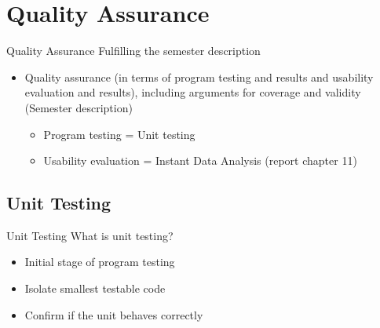 \section{Quality Assurance}

\begin{frame}[fragile] {Quality Assurance} {Fulfilling the semester description}
	\begin{itemize}
		\item Quality assurance (in terms of program testing and results and usability evaluation and results), including arguments for coverage and validity {\footnotesize (Semester description)}
		\begin{itemize}
			\item Program testing = Unit testing
			\item Usability evaluation = Instant Data Analysis (report chapter 11)
		\end{itemize}				
	\end{itemize}

\end{frame}

\subsection{Unit Testing}

\begin{frame}[fragile] {Unit Testing} {What is unit testing?}
	\begin{itemize}
		\item Initial stage of program testing
		\item Isolate smallest testable code
		\item Confirm if the unit behaves correctly
	\end{itemize}
\end{frame}

